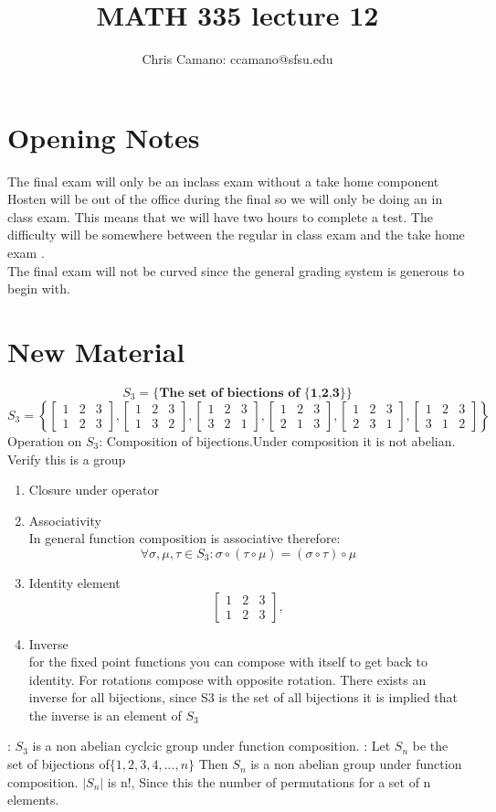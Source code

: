 \documentclass[11pt]{article}
\author{Chris Camano: ccamano@sfsu.edu}
\title{MATH 335  lecture 12 }
\date
\theoremstyle{definition}  %
\begin{document}
\maketitle
\section{Opening Notes}
The final exam will only be an inclass exam without a take home component Hosten will be out of the office during the final so we will only be doing an in class exam. This means that we will have two hours to complete a test. The difficulty will be somewhere between the regular in class exam and the take home exam . \\
The final exam will not be curved since the general grading system is generous to begin with.
\section{New Material}
\[
  S_3=\{\textbf{The set of biections of \{1,2,3}\}\}
\]
$$S_3=\left\{
\begin{bmatrix}
  1&2&3\\
  1&2&3
\end{bmatrix},
\begin{bmatrix}
  1&2&3\\
  1&3&2
\end{bmatrix},
\begin{bmatrix}
  1&2&3\\
  3&2&1
\end{bmatrix},
\begin{bmatrix}
  1&2&3\\
  2&1&3
\end{bmatrix},
\begin{bmatrix}
  1&2&3\\
  2&3&1
\end{bmatrix},
\begin{bmatrix}
  1&2&3\\
  3&1&2
\end{bmatrix}\right\}$$
Operation on $S_3$: Composition of bijections.Under composition it is not abelian.
Verify this is a group
\begin{enumerate}
  \item Closure under operator\\
  \item Associativity\\
  In general function composition is associative therefore:
  \[
    \forall \sigma, \mu, \tau \in S_3: \sigma \circ(\tau \circ \mu)=(\sigma \circ \tau)\circ \mu
  \]
  \item Identity element \\
  \[
  \begin{bmatrix}
    1&2&3\\
    1&2&3
  \end{bmatrix},
  \]
  \item Inverse\\
  for the fixed point functions you can compose with itself to get back to identity. For rotations compose with opposite rotation. There exists an inverse for all bijections, since S3 is the set of all bijections it is implied that the inverse is an element of $S_3$
\end{enumerate}
\theorem: $S_3$ is a non abelian cyclcic group under function composition. 
\theorem: Let $S_n$ be the set of bijections of$\{1,2,3,4,...,n\}$ Then $S_n$ is a non abelian group under function composition.
\theorem $|S_n|$ is n!, Since this the number of permutations for a set of n elements.
\end{document}
